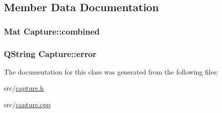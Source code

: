 \subsection{Member Data Documentation}
\hypertarget{class_capture_addc6e8bf729bb97b86a04be837b3188c}{
\subsubsection[{combined}]{\setlength{\rightskip}{0pt plus 5cm}Mat {\bf Capture::combined}}}
\label{class_capture_addc6e8bf729bb97b86a04be837b3188c}
\hypertarget{class_capture_a2fc9b180a1d2cc668d95a647a472d45c}{
\subsubsection[{error}]{\setlength{\rightskip}{0pt plus 5cm}QString {\bf Capture::error}}}
\label{class_capture_a2fc9b180a1d2cc668d95a647a472d45c}


The documentation for this class was generated from the following files:\begin{DoxyCompactItemize}
\item 
src/\hyperlink{capture_8h}{capture.h}\item 
src/\hyperlink{capture_8cpp}{capture.cpp}\end{DoxyCompactItemize}
